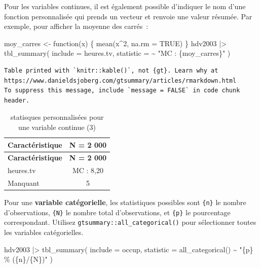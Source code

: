 \documentclass[
  letterpaper,
  DIV=11,
  numbers=noendperiod,
  oneside]{scrreprt}
\newenvironment{Shaded}{\begin{snugshade}}{\end{snugshade}}
\newcommand{\AttributeTok}[1]{\textcolor[rgb]{0.40,0.45,0.13}{#1}}
\newcommand{\ConstantTok}[1]{\textcolor[rgb]{0.56,0.35,0.01}{#1}}
\newcommand{\ControlFlowTok}[1]{\textcolor[rgb]{0.00,0.23,0.31}{#1}}
\newcommand{\DecValTok}[1]{\textcolor[rgb]{0.68,0.00,0.00}{#1}}
\newcommand{\FunctionTok}[1]{\textcolor[rgb]{0.28,0.35,0.67}{#1}}
\newcommand{\NormalTok}[1]{\textcolor[rgb]{0.00,0.23,0.31}{#1}}
\newcommand{\OtherTok}[1]{\textcolor[rgb]{0.00,0.23,0.31}{#1}}
\newcommand{\SpecialCharTok}[1]{\textcolor[rgb]{0.37,0.37,0.37}{#1}}
\newcommand{\StringTok}[1]{\textcolor[rgb]{0.13,0.47,0.30}{#1}}
\begin{document}
Pour les variables continues, il est également possible d'indiquer le
nom d'une fonction personnalisée qui prends un vecteur et renvoie une
valeur résumée. Par exemple, pour afficher la moyenne des carrés~:

\begin{Shaded}
\begin{Highlighting}[]
\NormalTok{moy\_carres }\OtherTok{\textless{}{-}} \ControlFlowTok{function}\NormalTok{(x) \{}
  \FunctionTok{mean}\NormalTok{(x}\SpecialCharTok{\^{}}\DecValTok{2}\NormalTok{, }\AttributeTok{na.rm =} \ConstantTok{TRUE}\NormalTok{)}
\NormalTok{\}}
\NormalTok{hdv2003 }\SpecialCharTok{|\textgreater{}}
  \FunctionTok{tbl\_summary}\NormalTok{(}
    \AttributeTok{include =}\NormalTok{ heures.tv,}
    \AttributeTok{statistic =} \SpecialCharTok{\textasciitilde{}} \StringTok{"MC : \{moy\_carres\}"}
\NormalTok{  )}
\end{Highlighting}
\end{Shaded}

\begin{verbatim}
Table printed with `knitr::kable()`, not {gt}. Learn why at
https://www.danieldsjoberg.com/gtsummary/articles/rmarkdown.html
To suppress this message, include `message = FALSE` in code chunk header.
\end{verbatim}

\hypertarget{tbl-stat-var-cont3}{}
\begin{longtable}[]{@{}lc@{}}
\caption{\label{tbl-stat-var-cont3}statisques personnalisées pour une
variable continue (3)}\tabularnewline
\toprule()
\textbf{Caractéristique} & \textbf{N = 2 000} \\
\midrule()
\endfirsthead
\toprule()
\textbf{Caractéristique} & \textbf{N = 2 000} \\
\midrule()
\endhead
heures.tv & MC : 8,20 \\
Manquant & 5 \\
\bottomrule()
\end{longtable}

Pour une \textbf{variable catégorielle}, les statistiques possibles sont
\texttt{\{n\}} le nombre d'observations, \texttt{\{N\}} le nombre total
d'observations, et \texttt{\{p\}} le pourcentage correspondant. Utilisez
\texttt{gtsummary::all\_categorical()} pour sélectionner toutes les
variables catégorielles.

\begin{Shaded}
\begin{Highlighting}[]
\NormalTok{hdv2003 }\SpecialCharTok{|\textgreater{}}
  \FunctionTok{tbl\_summary}\NormalTok{(}
    \AttributeTok{include =}\NormalTok{ occup,}
    \AttributeTok{statistic =} \FunctionTok{all\_categorical}\NormalTok{() }\SpecialCharTok{\textasciitilde{}} \StringTok{"\{p\} \% (\{n\}/\{N\})"}
\NormalTok{  )}
\end{Highlighting}
\end{Shaded}
\end{document}
